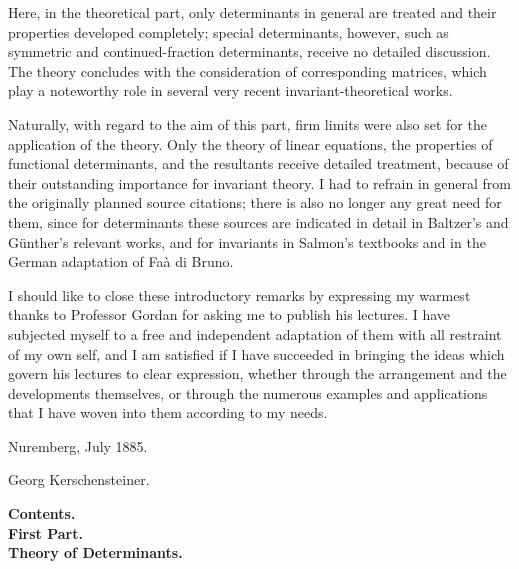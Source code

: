 \documentclass[10pt]{article}
\begin{document}
Here, in the theoretical part, only determinants in general are treated and their properties developed completely; special determinants, however, such as symmetric and continued-fraction determinants, receive no detailed discussion. The theory concludes with the consideration of corresponding matrices, which play a noteworthy role in several very recent invariant-theoretical works.

Naturally, with regard to the aim of this part, firm limits were also set for the application of the theory. Only the theory of linear equations, the properties of functional determinants, and the resultants receive detailed treatment, because of their outstanding importance for invariant theory. I had to refrain in general from the originally planned source citations; there is also no longer any great need for them, since for determinants these sources are indicated in detail in Baltzer's and Günther's relevant works, and for invariants in Salmon's textbooks and in the German adaptation of Faà di Bruno.

I should like to close these introductory remarks by expressing my warmest thanks to Professor Gordan for asking me to publish his lectures. I have subjected myself to a free and independent adaptation of them with all restraint of my own self, and I am satisfied if I have succeeded in bringing the ideas which govern his lectures to clear expression, whether through the arrangement and the developments themselves, or through the numerous examples and applications that I have woven into them according to my needs.

\begin{flushleft}
Nuremberg, July 1885.
\end{flushleft}
\begin{flushright}
Georg Kerschensteiner.
\end{flushright}


\begin{center}
{\bfseries Contents.}\\[0.35em]
{\bfseries First Part.}\\[0.35em]
{\bfseries Theory of Determinants.}
\end{center}
\end{document}
